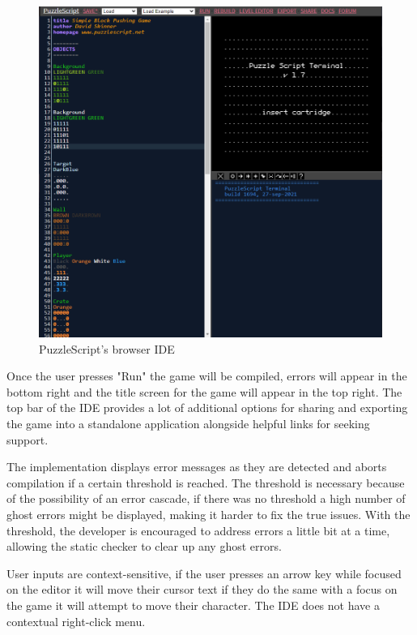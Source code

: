 \begin{figure}[h]
    \centering
    \includegraphics[width=1\textwidth]{images/PuzzleScript_IDE.png}
    \caption{PuzzleScript's browser IDE}
    \label{fig:browser_ide_old}
\end{figure}

Once the user presses "Run" the game will be compiled, errors will appear in the bottom right and the title screen for the game will appear in the top right. The top bar of the IDE provides a lot of additional options for sharing and exporting the game into a standalone application alongside helpful links for seeking support. 

The implementation displays error messages as they are detected and aborts compilation if a certain threshold is reached. The threshold is necessary because of the possibility of an error cascade, if there was no threshold a high number of ghost errors might be displayed, making it harder to fix the true issues. With the threshold, the developer is encouraged to address errors a little bit at a time, allowing the static checker to clear up any ghost errors.

User inputs are context-sensitive, if the user presses an arrow key while focused on the editor it will move their cursor text if they do the same with a focus on the game it will attempt to move their character. The IDE does not have a contextual right-click menu.

